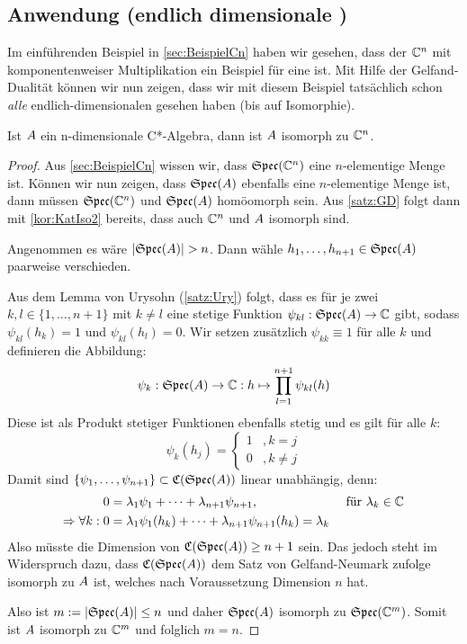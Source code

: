 \subsection{Anwendung (endlich dimensionale \CAlgn)}\label{sec:Anwendung}

Im einführenden Beispiel in \cref{sec:BeispielCn} haben wir gesehen, dass der $\mathbb{C}^n$ mit komponentenweiser Multiplikation ein Beispiel für eine \CAlg{} ist. Mit Hilfe der Gelfand-Dualität können wir nun zeigen, dass wir mit diesem Beispiel tatsächlich schon \emph{alle} endlich-dimensionalen \CAlgn{} gesehen haben (bis auf Isomorphie).

\begin{lemma}
Ist $A$ ein n-dimensionale C*-Algebra, dann ist $A$ isomorph zu $\mathbb{C}^n$.
\end{lemma}

\begin{proof}Aus \cref{sec:BeispielCn} wissen wir, dass $\mathfrak{Spec}(\mathbb{C}^n)$ eine $n$-elementige Menge ist. Können wir nun zeigen, dass $\mathfrak{Spec}(A)$ ebenfalls eine $n$-elementige Menge ist, dann müssen $\mathfrak{Spec}(\mathbb{C}^n)$ und $\mathfrak{Spec}(A)$ homöomorph sein. Aus \cref{satz:GD} folgt dann mit \cref{kor:KatIso2} bereits, dass auch $\mathbb{C}^n$ und $A$ isomorph sind.

Angenommen es wäre $|\mathfrak{Spec}(A)| > n$. Dann wähle $h_1, \dots, h_{n+1} \in \mathfrak{Spec}(A)$ paarweise verschieden. 

Aus dem Lemma von Urysohn (\ref{satz:Ury}) folgt, dass es für je zwei $k, l \in \{1, \dots, n+1\}$ mit $k \neq l$ eine stetige Funktion $\psi_{kl}: \mathfrak{Spec}(A) \to \mathbb{C}$ gibt, sodass $\psi_{kl}(h_k) = 1$ und $\psi_{kl}(h_l) = 0$. Wir setzen zusätzlich $\psi_{kk} \equiv 1$ für alle $k$ und definieren die Abbildung:
	\[\psi_k: \mathfrak{Spec}(A) \to \mathbb{C}: h \mapsto \prod_{l=1}^{n+1}\psi_{kl}(h)\]
Diese ist als Produkt stetiger Funktionen ebenfalls stetig und es gilt für alle $k$:
	\[\psi_k(h_j) = \begin{cases} 1 &, k=j \\ 0 &, k\neq j \end{cases}\]
Damit sind $\{\psi_1, \dots, \psi_{n+1}\} \subset \mathfrak{C}(\mathfrak{Spec}(A))$ linear unabhängig, denn:
	\begin{align*}
							 0 &= \lambda_1\psi_1 + \dots + \lambda_{n+1}\psi_{n+1}, &\text{ für } \lambda_k \in \mathbb{C} \\
	\Rightarrow \forall k:   0 &= \lambda_1\psi_1(h_k) + \dots + \lambda_{n+1}\psi_{n+1}(h_k) = \lambda_k &
	\end{align*}
Also müsste die Dimension von $\mathfrak{C}(\mathfrak{Spec}(A)) \geq n+1$ sein. Das jedoch steht im Widerspruch dazu, dass $\mathfrak{C}(\mathfrak{Spec}(A))$ dem Satz von Gelfand-Neumark zufolge isomorph zu $A$ ist, welches nach Voraussetzung Dimension $n$ hat.

Also ist $m := |\mathfrak{Spec}(A)| \leq n$ und daher $\mathfrak{Spec}(A)$ isomorph zu $\mathfrak{Spec}(\mathbb{C}^m)$. Somit ist $A$ isomorph zu $\mathbb{C}^m$ und folglich $m = n$.
\end{proof}